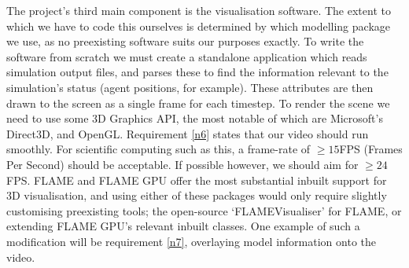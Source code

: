 \documentclass[11pt,a4paper]{article}
\begin{document}
The project's third main component is the visualisation software. The extent to which we have to code this ourselves is determined by which modelling package we use, as no preexisting software suits our purposes exactly. To write the software from scratch we must create a standalone application which reads simulation output files, and parses these to find the information relevant to the simulation's status (agent positions, for example). These attributes are then drawn to the screen as a single frame for each timestep. To render the scene we need to use some 3D Graphics API, the most notable of which are Microsoft's Direct3D, and OpenGL. Requirement \ref{n6} states that our video should run smoothly. For scientific computing such as this, a frame-rate of $\geq 15$FPS (Frames Per Second) should be acceptable. If possible however, we should aim for $\geq 24$FPS.
FLAME and FLAME GPU offer the most substantial inbuilt support for 3D visualisation, and using either of these packages would only require slightly customising preexisting tools; the open-source `FLAMEVisualiser' for FLAME, or extending FLAME GPU's relevant inbuilt classes. One example of such a modification will be requirement \ref{n7}, overlaying model information onto the video.
\end{document}
